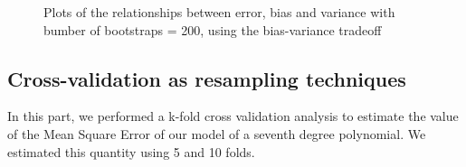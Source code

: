 \documentclass{article}
\begin{document}
\begin{figure}[h]\centering
{}\hfill
{} \par
{}\hfill
{}\par
\caption{Plots of the relationships between error, bias and variance with bumber of bootstraps = 200, using the bias-variance tradeoff}
\label{fig}
\end{figure}





\subsection{Cross-validation as resampling techniques}
In this part, we performed a k-fold cross validation analysis to estimate the value of the Mean Square Error of our model of a seventh degree polynomial. We estimated this quantity using 5 and 10 folds.
\end{document}
